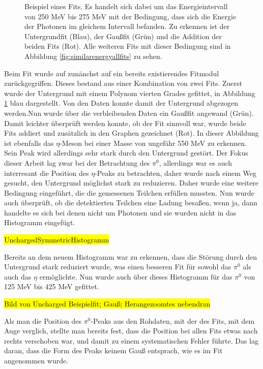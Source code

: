 \documentclass[a4paper,11pt,oneside,final,german,openbib,pdftex]{scrbook}
\begin{document}
{\begin{figure}[h!]
\begin{center}
		\caption{Beispiel eines Fits. Es handelt sich dabei um das Energieintervall von 250 MeV bis 275 MeV mit der Bedingung, dass sich die Energie der Photonen im gleichem Intervall befanden.
		Zu erkennen ist der Untergrundfit (Blau), der Gau{\ss}fit (Gr\"un) und die Addition der beiden Fits (Rot). Alle weiteren Fits mit dieser Bedingung sind in Abbildung \ref{fig:similarenergyallfits} zu sehen.
	}
		\label{fig:fitexampleenergyinterval0903}	
	\end{center}
\end{figure}

 Beim Fit wurde auf zun\"anchst auf ein bereits existierendes Fitmodul zur\"uckgegriffen. Dieses bestand aus einer Kombination von zwei Fits. Zuerst wurde der Untergrund mit einem Polynom vierten Grades gefittet, in Abbildung \ref{fig:fitexampleenergyinterval0903} blau dargestellt. Von den Daten konnte damit der Untergrund abgezogen werden.Nun wurde \"uber die verbleibenden Daten ein Gau{\ss}fit angewand (Gr\"un). Damit leichter \"uberpr\"uft werden konnte, ob der Fit sinnvoll war, wurde beide Fits addiert und zus\"atzlich in den Graphen gezeichnet (Rot). In dieser Abbildung ist ebenfalls das $\eta$-Meson bei einer Masse von ungef\"ahr 550 MeV zu erkennen. Sein Peak wird allerdings sehr stark durch den Untergrund gest\"ort. Der Fokus dieser Arbeit lag zwar bei der Betrachtung des $\pi^0$, allerdings war es auch interresant die Position des $\eta$-Peaks zu betrachten, daher wurde nach einem Weg gesucht, den Untergrund m\"oglichst stark zu reduzieren. Daher wurde eine weitere Bedingung eingef\"uhrt, die die gemessenen Teilchen erf\"ullen mussten. Nun wurde auch \"uberpr\"uft, ob die detektierten Teilchen eine Ladung besa{\ss}en, wenn ja, dann handelte es sich bei denen nicht um Photonen und sie wurden nicht in das Histogramm eingef\"ugt. 
 
 \colorbox{yellow}{UnchargedSymmetricHistogramm}
 
 Bereits an dem neuem Histogramm war zu erkennen, dass die St\"orung durch den Untergrund stark reduziert wurde, was einen besseren Fit f\"ur sowohl das $\pi^0$ als auch das $\eta$ erm\"oglichte.
 Nun wurde auch \"uber dieses Histogramm f\"ur das $\pi^0$ von 125 MeV bis 425 MeV gefittet.
 
 \colorbox{yellow}{Bild von Uncharged Beispielfit; Gau{\ss}; Herangezoomtes nebendran}


Als man die Position des $\pi^0$-Peaks aus den Rohdaten, mit der des Fits, mit dem Auge verglich, stellte man bereits fest, dass die Position bei allen Fits etwas nach rechts verschoben war, und damit zu einem systematischen Fehler f\"uhrte. Das lag daran, dass die Form des Peaks keinem Gau{\ss} entsprach, wie es im Fit angenommen wurde.

}
\end{document}
